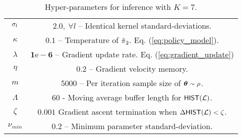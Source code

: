     \begin{table}[H]
        \centering
        \begin{tabular}{c|c}
                $\sigma_{l}$ & $\mathbf{2.0},\ \forall l$ -- Identical kernel standard-deviations.\\
                $\kappa$ & $0.1$ -- Temperature of $\hat{\pi_{}}_2$. Eq. (\ref{eq:policy_model}). \\
                $\lambda$ & $\mathbf{1\mathrm{e}\!-\!6}$ -- Gradient update rate. Eq. (\ref{eq:gradient_update}) \\
                $\eta$ & $\mathbf{0.2}$ -- Gradient velocity memory.\\
                $m$ & 5000 -- Per iteration sample size of $\boldsymbol{\mathbb{\theta}}\sim \rho$.\\
                $\Lambda$ & $60$ - Moving average buffer length for $\mathsf{HIST}(\mathcal{L})$. \\
                $\zeta$ & $0.001$ Gradient ascent termination when $\Delta\mathsf{HIST}(\mathcal{L}) < \zeta$.\\
                $\nu_{min}$ & $0.2$ -- Minimum parameter standard-deviation.\\
        \end{tabular}
        \caption{Hyper-parameters for inference with $K=7$.}
        \label{table:single_agent_new_hyper_params}
    \end{table}

    \begin{figure}[htb]
        \begin{center}
        \end{center}
    \end{figure}

    \begin{figure}[htb]
        \begin{center}
        \end{center}
    \end{figure}


